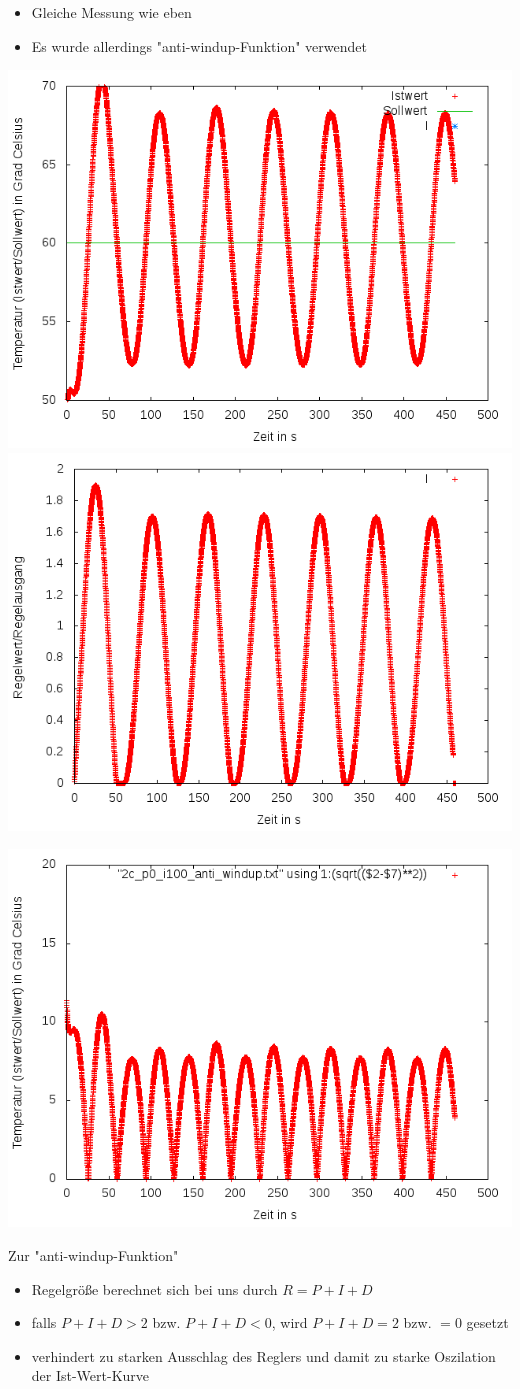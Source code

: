 \documentclass[compress,11pt]{beamer}
\begin{document}
\begin{frame}
\begin{itemize}
\item Gleiche Messung wie eben
\item Es wurde allerdings "anti-windup-Funktion" verwendet
\end{itemize}
\includegraphics[width=.5\textwidth]{../2aufgabe/2c2}
\includegraphics[width=.5\textwidth]{../2aufgabe/2c2_I}
\end{frame}
\begin{frame}
\includegraphics[width=.7\textwidth]{../2aufgabe/2c2_betrag}
\end{frame}
\begin{frame}
\begin{block}{Zur "anti-windup-Funktion"}
\begin{itemize}
\item Regelgröße berechnet sich bei uns durch $R = P + I + D$
\item falls $P + I + D > 2$ bzw. $P + I + D < 0$, wird $P + I + D = 2$ bzw. $= 0$ gesetzt
\item verhindert zu starken Ausschlag des Reglers und damit zu starke Oszilation der Ist-Wert-Kurve
\end{itemize}
\end{block}
\end{frame}
\end{document}
